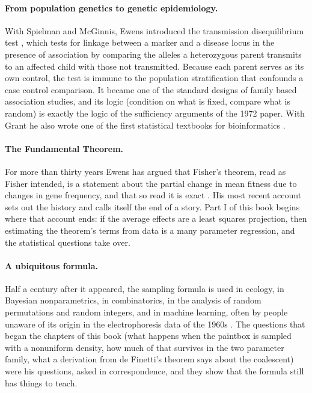 \paragraph{From population genetics to genetic epidemiology.} With Spielman and McGinnis, Ewens
introduced the transmission disequilibrium test \citep{intro:spielman1993}, which tests for linkage
between a marker and a disease locus in the presence of association by comparing the alleles a
heterozygous parent transmits to an affected child with those not transmitted. Because each parent
serves as its own control, the test is immune to the population stratification that confounds a
case control comparison. It became one of the standard designs of family based association
studies, and its logic (condition on what is fixed, compare what is random) is exactly the logic of
the sufficiency arguments of the 1972 paper. With Grant he also wrote one of the first statistical
textbooks for bioinformatics \citep{intro:ewens2001}.

\paragraph{The Fundamental Theorem.} For more than thirty years Ewens has argued that Fisher's
theorem, read as Fisher intended, is a statement about the partial change in mean fitness due to
changes in gene frequency, and that so read it is exact \citep{intro:ewens1989,
intro:ewens2015}. His most recent account \citep{intro:ewens2024} sets out the history and calls
itself the end of a story. Part I of this book begins where that account ends: if the average
effects are a least squares projection, then estimating the theorem's terms from data is a many
parameter regression, and the statistical questions take over.

\paragraph{A ubiquitous formula.} Half a century after it appeared, the sampling formula is used in
ecology, in Bayesian nonparametrics, in combinatorics, in the analysis of random permutations and
random integers, and in machine learning, often by people unaware of its origin in the
electrophoresis data of the 1960s \citep{intro:arratia2003, intro:crane2016}. The questions that
began the chapters of this book (what happens when the paintbox is sampled with a nonuniform
density, how much of that survives in the two parameter family, what a derivation from de Finetti's
theorem says about the coalescent) were his questions, asked in correspondence, and they show that
the formula still has things to teach.

